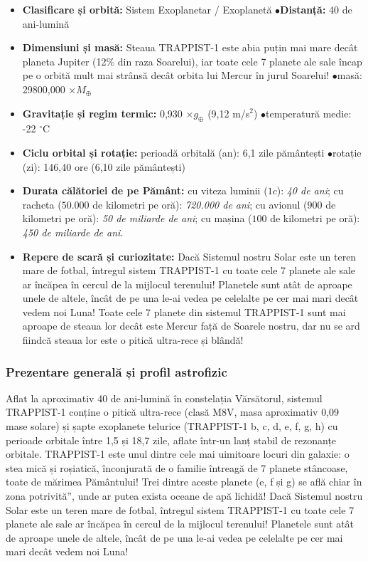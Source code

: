 \begin{tcolorbox}[orbitardata, title={\textbf{Repere esențiale: Sistemul TRAPPIST-1 (7 Exoplanete)}}]
\small
\begin{itemize}[leftmargin=1.4em, itemsep=2pt, topsep=2pt]
  \item \textbf{Clasificare și orbită:} Sistem Exoplanetar / Exoplanetă \quad$\bullet$\quad \textbf{Distanță:} 40 de ani-lumină
  \item \textbf{Dimensiuni și masă:} Steaua TRAPPIST-1 este abia puțin mai mare decât planeta Jupiter (12\% din raza Soarelui), iar toate cele 7 planete ale sale încap pe o orbită mult mai strânsă decât orbita lui Mercur în jurul Soarelui! \quad$\bullet$\quad masă: 29800,000 $\times M_\oplus$
  \item \textbf{Gravitație și regim termic:} 0,930 $\times g_\oplus$ (9,12 m/s$^2$) \quad$\bullet$\quad temperatură medie: -22 $^\circ$C
  \item \textbf{Ciclu orbital și rotație:} perioadă orbitală (an): 6,1 zile pământești \quad$\bullet$\quad rotație (zi): 146,40 ore (6,10 zile pământești)
  \item \textbf{Durata călătoriei de pe Pământ:} cu viteza luminii ($1c$): \emph{40 de ani}; cu racheta ($50.000$ de kilometri pe oră): \emph{720.000 de ani}; cu avionul ($900$ de kilometri pe oră): \emph{50 de miliarde de ani}; cu mașina ($100$ de kilometri pe oră): \emph{450 de miliarde de ani}.
  \item \textbf{Repere de scară și curiozitate:} Dacă Sistemul nostru Solar este un teren mare de fotbal, întregul sistem TRAPPIST-1 cu toate cele 7 planete ale sale ar încăpea în cercul de la mijlocul terenului! Planetele sunt atât de aproape unele de altele, încât de pe una le-ai vedea pe celelalte pe cer mai mari decât vedem noi Luna! Toate cele 7 planete din sistemul TRAPPIST-1 sunt mai aproape de steaua lor decât este Mercur față de Soarele nostru, dar nu se ard fiindcă steaua lor este o pitică ultra-rece și blândă!
\end{itemize}
\end{tcolorbox}

\subsubsection*{Prezentare generală și profil astrofizic}
Aflat la aproximativ 40 de ani-lumină în constelația Vărsătorul, sistemul TRAPPIST-1 conține o pitică ultra-rece (clasă M8V, masa aproximativ 0,09 mase solare) și șapte exoplanete telurice (TRAPPIST-1 b, c, d, e, f, g, h) cu perioade orbitale între 1,5 și 18,7 zile, aflate într-un lanț stabil de rezonanțe orbitale. TRAPPIST-1 este unul dintre cele mai uimitoare locuri din galaxie: o stea mică și roșiatică, înconjurată de o familie întreagă de 7 planete stâncoase, toate de mărimea Pământului! Trei dintre aceste planete (e, f și g) se află chiar în \quotedblbase{}zona potrivită\textquotedblright{}, unde ar putea exista oceane de apă lichidă! Dacă Sistemul nostru Solar este un teren mare de fotbal, întregul sistem TRAPPIST-1 cu toate cele 7 planete ale sale ar încăpea în cercul de la mijlocul terenului! Planetele sunt atât de aproape unele de altele, încât de pe una le-ai vedea pe celelalte pe cer mai mari decât vedem noi Luna!

